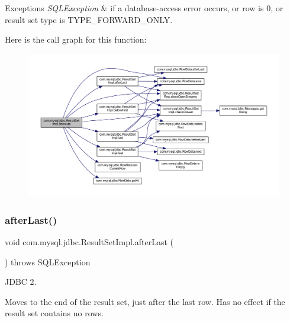 \begin{DoxyExceptions}{Exceptions}
{\em S\+Q\+L\+Exception} & if a database-\/access error occurs, or row is 0, or result set type is T\+Y\+P\+E\+\_\+\+F\+O\+R\+W\+A\+R\+D\+\_\+\+O\+N\+LY. \\
\hline
\end{DoxyExceptions}
Here is the call graph for this function\+:
\nopagebreak
\begin{figure}[H]
\begin{center}
\leavevmode
\includegraphics[width=350pt]{classcom_1_1mysql_1_1jdbc_1_1_result_set_impl_a780c371204d84b09d2bdcd86a1a67ac3_cgraph}
\end{center}
\end{figure}
\mbox{\label{classcom_1_1mysql_1_1jdbc_1_1_result_set_impl_aee4b698ed324d8836812bd80994aeb5e}} 
\subsubsection{\texorpdfstring{after\+Last()}{afterLast()}}
{\footnotesize\ttfamily void com.\+mysql.\+jdbc.\+Result\+Set\+Impl.\+after\+Last (\begin{DoxyParamCaption}{ }\end{DoxyParamCaption}) throws S\+Q\+L\+Exception}

J\+D\+BC 2.

Moves to the end of the result set, just after the last row. Has no effect if the result set contains no rows. 


